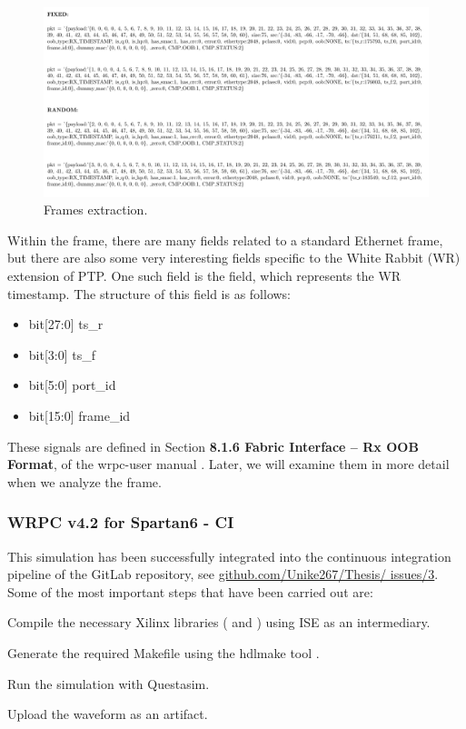 \begin{figure}[H]
\centering
\includegraphics[width=14.5cm]{figures/frames.pdf}
\caption{Frames extraction.}
\label{fig:frame-res}
\end{figure}

\noindent Within the frame, there are many fields related to a standard Ethernet frame, but there are also some very interesting fields specific to the White Rabbit (WR) extension of PTP.
One such field is the  field, which represents the WR timestamp.
The structure of this field is as follows:

\begin{itemize}
\item bit[27:0] ts\_r
\item bit[3:0] ts\_f
\item bit[5:0] port\_id
\item bit[15:0] frame\_id
\end{itemize}

\noindent These signals are defined in Section \textbf{8.1.6 Fabric Interface – Rx OOB Format}, of the wrpc-user manual \cite{WR-core:manual}.
Later, we will examine them in more detail when we analyze the frame.

\vspace{5mm}

\subsubsection{WRPC v4.2 for Spartan6 - CI}

\noindent This simulation has been successfully integrated into the continuous integration pipeline of the GitLab repository, see \href{https://github.com/Unike267/Thesis/issues/3}{github.com/Unike267/Thesis/ issues/3}.
Some of the most important steps that have been carried out are:

\begin{dig}
\item Compile the necessary Xilinx libraries ( and ) using ISE as an intermediary.
\item Generate the required Makefile using the hdlmake tool \cite{hdl-make:ohwr}.
\item Run the simulation with Questasim.
\item Upload the waveform as an artifact.
\end{dig}

